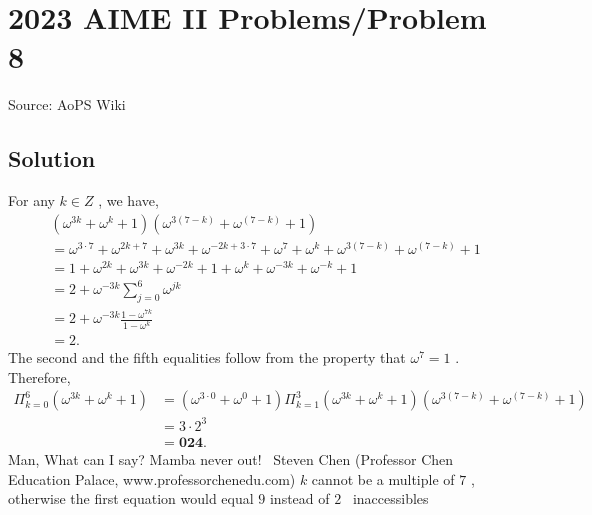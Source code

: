 \documentclass[12pt]{article}
\begin{document}
\section*{{2023 AIME II Problems/Problem 8}}
Source: AoPS Wiki

\subsection*{Solution}
For any $k\in Z$ , we have, \begin{align*} & \left( \omega^{3k} + \omega^k + 1 \right) \left( \omega^{3\left( 7 - k \right)} + \omega^{\left( 7 - k \right)} + 1 \right) \\ & = \omega^{3 \cdot 7} + \omega^{2k + 7} + \omega^{3k} + \omega^{-2k + 3 \cdot 7} + \omega^7 + \omega^k + \omega^{3\left( 7 - k \right)} + \omega^{\left( 7 - k \right)} + 1 \\ & = 1 + \omega^{2k} + \omega^{3k} + \omega^{-2k} + 1 + \omega^k + \omega^{-3k} + \omega^{-k} + 1 \\ & = 2 + \omega^{-3k} \sum_{j=0}^6 \omega^{j k} \\ & = 2 + \omega^{-3k} \frac{1 - \omega^{7 k}}{1 - \omega^k} \\ & = 2 . \end{align*} The second and the fifth equalities follow from the property that $\omega^7 = 1$ . Therefore, \begin{align*} \Pi_{k=0}^6 \left( \omega^{3k} + \omega^k + 1 \right) & = \left( \omega^{3 \cdot 0} + \omega^0 + 1 \right) \Pi_{k=1}^3 \left( \omega^{3k} + \omega^k + 1 \right) \left( \omega^{3\left( 7 - k \right)} + \omega^{\left( 7 - k \right)} + 1 \right) \\ & = 3 \cdot 2^3 \\ & = \boxed{\textbf{024}}. \end{align*} Man, What can I say? Mamba never out! ~Steven Chen (Professor Chen Education Palace, www.professorchenedu.com) $k$ cannot be a multiple of $7$ , otherwise the first equation would equal $9$ instead of $2$ ~inaccessibles
\end{document}

